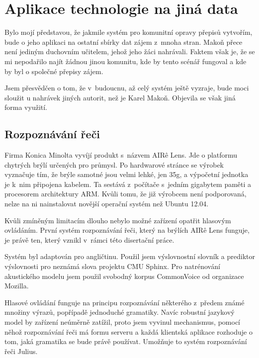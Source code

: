 \chapter{Aplikace technologie na jiná data}
\label{kap:jina-data}

Bylo mojí představou, že jakmile systém pro komunitní opravy přepisů vytvořím,
bude o jeho aplikaci na ostatní sbírky dat zájem z~mnoha stran. Makoň přece není
jediným duchovním učitelem, jehož jeho žáci nahrávali. Faktem však je, že se mi
nepodařilo najít žádnou jinou komunitu, kde by tento scénář fungoval a kde by
byl o společné přepisy zájem.

Jsem přesvědčen o tom, že v~budoucnu, až celý systém ještě vyzraje, bude moci
sloužit u nahrávek jiných autorit, než je Karel Makoň. Objevila se však jiná
forma využití.

\section{Rozpoznávání řeči}

Firma Konica Minolta vyvíjí produkt s~názvem AIR\^{e} Lens. Jde o platformu
chytrých brýlí určených pro průmysl. Po hardwarové stránce se výrobek vyznačuje
tím, že brýle samotné jsou velmi lehké, jen 35g, a výpočetní jednotka je k~nim
připojena kabelem. Ta sestává z~počítače s~jedním gigabytem paměti a procesorem
architektury ARM. Kvůli tomu, že již výrobcem není podporovaná, nelze na ni
nainstalovat novější operační systém než Ubuntu 12.04.

Kvůli zmíněným limitacím dlouho nebylo možné zařízení opatřit hlasovým
ovládáním. První systém rozpoznávání řeči, který na brýlích AIR\^{e} Lens
funguje, je právě ten, který vznikl v~rámci této disertační práce.

Systém byl adaptován pro angličtinu. Použil jsem výslovnostní slovník a
prediktor výslovnosti pro neznámá slova projektu CMU Sphinx\cite{huggins2006pocketsphinx}\cite{lamere2003cmu}.
Pro natrénování akustického modelu jsem použil svobodný korpus CommonVoice od
organizace Mozilla.

Hlasové ovládání funguje na principu rozpoznávání některého z~předem známé
množiny výrazů, popřípadě jednoduché gramatiky. Navíc robustní jazykový model by
zařízení neúměrně zatížil, proto jsem vyvinul mechanismus, pomocí něhož
rozpoznávání řeči má formu serveru a každá klientská aplikace rozhoduje o tom,
jaká gramatika se bude právě používat. Umožňuje to systém rozpoznávání řeči
Julius\cite{lee2001julius}\cite{lee2009recent}.

